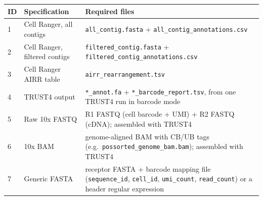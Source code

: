 \documentclass[11pt]{article}
\begin{document}
\begin{center}
\small
\begin{tabular}{p{}p{}p{}}
\toprule
\textbf{ID} & \textbf{Specification} & \textbf{Required files} \\
\midrule
1 & Cell Ranger, all contigs & \texttt{all\_contig.fasta} + \texttt{all\_contig\_annotations.csv} \\
2 & Cell Ranger, filtered contigs & \texttt{filtered\_contig.fasta} + \texttt{filtered\_contig\_annotations.csv} \\
3 & Cell Ranger AIRR table & \texttt{airr\_rearrangement.tsv} \\
4 & TRUST4 output & \texttt{*\_annot.fa} + \texttt{*\_barcode\_report.tsv}, from one TRUST4 run in barcode mode \\
5 & Raw 10x FASTQ & R1 FASTQ (cell barcode + UMI) + R2 FASTQ (cDNA); assembled with TRUST4 \\
6 & 10x BAM & genome-aligned BAM with CB/UB tags (e.g.\ \texttt{possorted\_genome\_bam.bam}); assembled with TRUST4 \\
7 & Generic FASTA & receptor FASTA + barcode mapping file (\texttt{sequence\_id}, \texttt{cell\_id}, \texttt{umi\_count}, \texttt{read\_count}) or a header regular expression \\
\bottomrule
\end{tabular}
\end{center}
\end{document}
